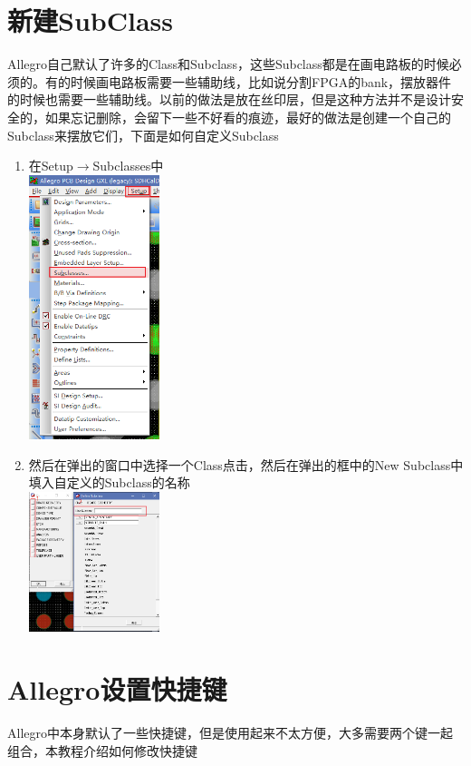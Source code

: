 \documentclass[color=green,mathpazo,titlestyle=hang,11pt]{elegantbook}
\begin{document}
\section{新建SubClass}
Allegro自己默认了许多的Class和Subclass，这些Subclass都是在画电路板的时候必须的。有的时候画电路板需要一些辅助线，比如说分割FPGA的bank，摆放器件的时候也需要一些辅助线。以前的做法是放在丝印层，但是这种方法并不是设计安全的，如果忘记删除，会留下一些不好看的痕迹，最好的做法是创建一个自己的Subclass来摆放它们，下面是如何自定义Subclass
\begin{enumerate}
	\item 在Setup$\rightarrow$Subclasses中 \\ \includegraphics[width=0.3\textwidth]{figures/SetupSubclass.png}
	\item 然后在弹出的窗口中选择一个Class点击，然后在弹出的框中的New Subclass中填入自定义的Subclass的名称 \\ \includegraphics[width=0.3\textwidth]{figures/NewSubclass.png}
\end{enumerate}

\section{Allegro设置快捷键}
Allegro中本身默认了一些快捷键，但是使用起来不太方便，大多需要两个键一起组合，本教程介绍如何修改快捷键
\end{document}
